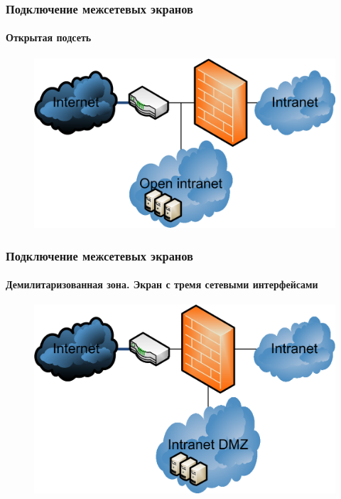\begin{frame}
    \frametitle{Подключение межсетевых экранов}
    \framesubtitle{Открытая подсеть}
    
    \begin{figure}
        \includegraphics[width=.9\textwidth]{fig/fwallopen}\\
    \end{figure}
\end{frame}

\begin{frame}
    \frametitle{Подключение межсетевых экранов}
    \framesubtitle{Демилитаризованная зона. Экран с тремя сетевыми интерфейсами}
    
    \begin{figure}
        \includegraphics[width=.9\textwidth]{fig/fwalldmz}\\
    \end{figure}
\end{frame}

